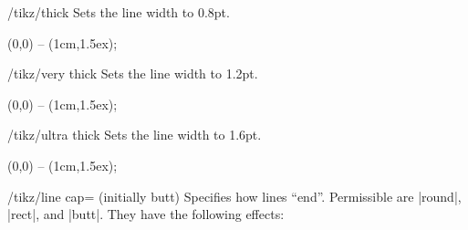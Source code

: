 \begin{stylekey}{/tikz/thick}
    Sets the line width to 0.8pt.
\begin{codeexample}[]
  \tikz \draw[thick] (0,0) -- (1cm,1.5ex);
\end{codeexample}
\end{stylekey}

\begin{stylekey}{/tikz/very thick}
    Sets the line width to 1.2pt.
\begin{codeexample}[]
  \tikz {} (0,0) -- (1cm,1.5ex);
\end{codeexample}
\end{stylekey}

\begin{stylekey}{/tikz/ultra thick}
    Sets the line width to 1.6pt.
\begin{codeexample}[]
  \tikz {} (0,0) -- (1cm,1.5ex);
\end{codeexample}
\end{stylekey}

    \label{section-line-cap}
\begin{key}{/tikz/line cap= (initially butt)}
    Specifies how lines ``end''. Permissible  are |round|, |rect|,
    and |butt|. They have the following effects:
\begin{codeexample}[]
\end{codeexample}
\end{key}

